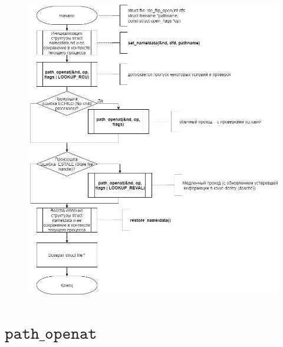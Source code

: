 \documentclass[a4paper,14pt]{extreport}
\begin{document}
\begin{figure}[H]
	\centering
	\includegraphics[scale=0.45]{img/do_filp_open.jpg}
	\label{fig:do_filp_open}
\end{figure}




\section{$\texttt{path\_openat}$}
\end{document}
